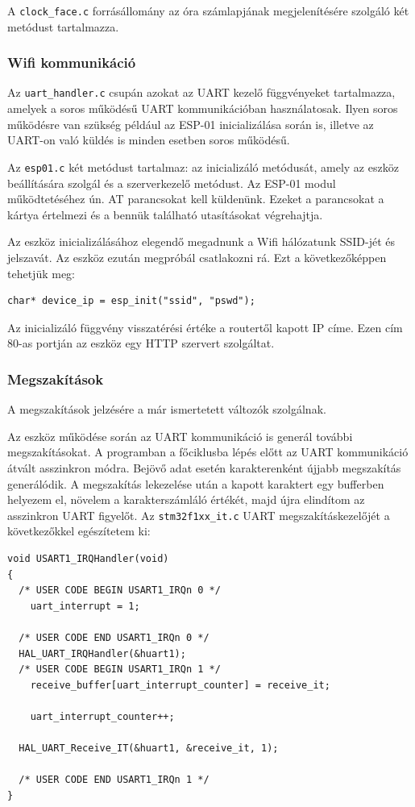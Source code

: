\documentclass[a4paper, 12pt]{article}
\begin{document}
A \texttt{clock\_face.c} forrásállomány az óra számlapjának megjelenítésére szolgáló két metódust tartalmazza.

\subsubsection{Wifi kommunikáció}

Az \texttt{uart\_handler.c} csupán azokat az UART kezelő függvényeket tartalmazza, amelyek a soros működésű UART kommunikációban használatosak. Ilyen soros működésre van szükség például az ESP-01 inicializálása során is, illetve az UART-on való küldés is minden esetben soros működésű.

\bigskip

Az \texttt{esp01.c} két metódust tartalmaz: az inicializáló metódusát, amely az eszköz beállítására szolgál és a szerverkezelő metódust.
Az ESP-01 modul működtetéséhez ún. AT parancsokat kell küldenünk. Ezeket a parancsokat a kártya értelmezi és a bennük található utasításokat végrehajtja.

Az eszköz inicializálásához elegendő megadnunk a Wifi hálózatunk SSID-jét és jelszavát. Az eszköz ezután megpróbál csatlakozni rá. Ezt a következőképpen tehetjük meg:
\begin{lstlisting}[style=CStyle]
char* device_ip = esp_init("ssid", "pswd");
\end{lstlisting}
Az inicializáló függvény visszatérési értéke a routertől kapott IP címe. Ezen cím 80-as portján az eszköz egy HTTP szervert szolgáltat.

\subsubsection{Megszakítások}

A megszakítások jelzésére a már ismertetett változók szolgálnak.

Az eszköz működése során az UART kommunikáció is generál további megszakításokat.
A programban a főciklusba lépés előtt az UART kommunikáció átvált asszinkron módra. Bejövő adat esetén karakterenként újjabb megszakítás generálódik. A megszakítás lekezelése után a kapott karaktert egy bufferben helyezem el, növelem a karakterszámláló értékét, majd újra elindítom az asszinkron UART figyelőt.
Az \texttt{stm32f1xx\_it.c} UART megszakításkezelőjét a következőkkel egészítetem ki: 
\begin{lstlisting}[style=CStyle]
void USART1_IRQHandler(void)
{
  /* USER CODE BEGIN USART1_IRQn 0 */
	uart_interrupt = 1;

  /* USER CODE END USART1_IRQn 0 */
  HAL_UART_IRQHandler(&huart1);
  /* USER CODE BEGIN USART1_IRQn 1 */
	receive_buffer[uart_interrupt_counter] = receive_it;

	uart_interrupt_counter++;

  HAL_UART_Receive_IT(&huart1, &receive_it, 1);

  /* USER CODE END USART1_IRQn 1 */
}
\end{lstlisting}
\end{document}
